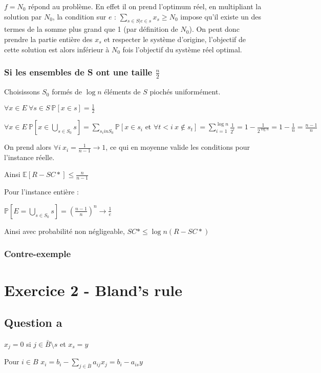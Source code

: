 \documentclass{article}
\newcommand{\PP}[1]{\mathbb{P}\left[ #1 \right ]}
\newcommand{\EE}[1]{\mathbb{E}\left[ #1 \right ]}
\begin{document}
$f=N_0$ répond au problème. En effet il on prend l'optimum réel, en multipliant la solution par $N_0$, la condition sur $e$ :  $\sum_{s \in S | e \in s} x_s \geq N_0$ impose qu'il existe un des termes de la somme plus grand que 1 (par définition de $N_0$). On peut donc prendre la partie entière des $x_s$ et respecter le système d'origine, l'objectif de cette solution est alors inférieur à $N_0$ fois l'objectif du système réel optimal.

\subsubsection*{Si les ensembles de S ont une taille $\frac{n}{2}$}

Choisissons $S_0$ formés de $\log n$ éléments de $S$ piochés uniformément.

$\forall x \in E \ \forall s \in S \ \PP{x \in s}=\frac{1}{2}$

$\forall x \in E \ \PP{x \in \bigcup_{s\in S_0} s}=\sum_{s_i in S_0}\PP{x \in s_i \text{ et } \forall t<i\ x \notin s_t }=\sum_{i=1}^{\log n}{\frac{1}{2^i}}=1-\frac{1}{2^{\log n}}=1-\frac{1}{n}=\frac{n-1}{n}$

On prend alors $\forall i\ x_i=\frac{1}{n-1}\rightarrow 1$, ce qui en moyenne valide les conditions pour l'instance réelle.

Ainsi $\EE{R-SC*}\leq \frac{n}{n-1}$

Pour l'instance entière :

$\PP{E=\bigcup_{s\in S_0} s}={\left(\frac{n-1}{n}\right)}^n \rightarrow \frac{1}{e}$

Ainsi avec probabilité non négligeable, $SC* \leq \log n  (R-SC*)$

\subsubsection*{Contre-exemple}

\section*{Exercice 2 - Bland's rule}
\subsection*{Question a}

$x_j=0$ si $j\in \bar{B}\setminus s$ et $x_s=y$

Pour $i \in B$ $x_i=b_i-\sum_{j\in\bar{B}}a_{ij}x_j= b_i-a_{is}y$
\end{document}
